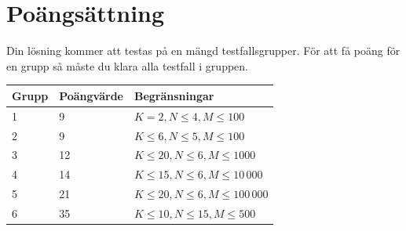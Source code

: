 \section*{Poängsättning}
Din lösning kommer att testas på en mängd testfallsgrupper. För att få poäng för en grupp så måste du klara alla testfall i gruppen.

\begin{tabular}{| l | l | l |}
	\hline
	Grupp & Poängvärde & Begränsningar\\ \hline
	1     & 9          & $K = 2, N \le 4, M \le 100$ \\ \hline
	2     & 9          & $K \le 6, N \le 5, M \le 100$ \\ \hline
	3     & 12         & $K \le 20, N \le 6, M \le 1000$ \\ \hline
	4     & 14         & $K \le 15, N \le 6, M \le 10\,000$ \\ \hline
	5     & 21         & $K \le 20, N \le 6, M \le 100\,000$ \\ \hline
	6     & 35         & $K \le 10, N \le 15, M \le 500$ \\ \hline
\end{tabular}
